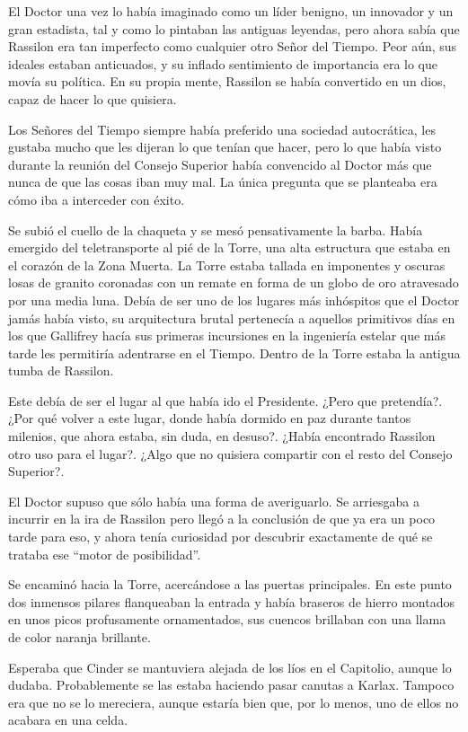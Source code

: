 El Doctor una vez lo había imaginado como un líder benigno, un innovador y un gran estadista, tal y como lo pintaban las antiguas leyendas, pero ahora sabía que Rassilon era tan imperfecto como cualquier otro Señor del Tiempo. Peor aún, sus ideales estaban anticuados, y su inflado sentimiento de importancia era lo que movía su política. En su propia mente, Rassilon se había convertido en un dios, capaz de hacer lo que quisiera. 

Los Señores del Tiempo siempre había preferido una sociedad autocrática, les gustaba mucho que les dijeran lo que tenían que hacer, pero lo que había visto durante la reunión del Consejo Superior había convencido al Doctor más que nunca de que las cosas iban muy mal. La única pregunta que se planteaba era cómo iba a interceder con éxito. 

Se subió el cuello de la chaqueta y se mesó pensativamente la barba. Había emergido del teletransporte al pié de la Torre, una alta estructura que estaba en el corazón de la Zona Muerta. La Torre estaba tallada en imponentes y oscuras losas de granito coronadas con un remate en forma de un globo de oro atravesado por una media luna. Debía de ser uno de los lugares más inhóspitos que el Doctor jamás había visto, su arquitectura brutal pertenecía a aquellos primitivos días en los que Gallifrey hacía sus primeras incursiones en la ingeniería estelar que más tarde les permitiría adentrarse en el Tiempo. Dentro de la Torre estaba la antigua tumba de Rassilon. 

Este debía de ser el lugar al que había ido el Presidente. ¿Pero que pretendía?. ¿Por qué volver a este lugar, donde había dormido en paz durante tantos milenios, que ahora estaba, sin duda, en desuso?. ¿Había encontrado Rassilon otro uso para el lugar?. ¿Algo que no quisiera compartir con el resto del Consejo Superior?. 

El Doctor supuso que sólo había una forma de averiguarlo. Se arriesgaba a incurrir en la ira de Rassilon pero llegó a la conclusión de que ya era un poco tarde para eso, y ahora tenía curiosidad por descubrir exactamente de qué se trataba ese ``motor de posibilidad''. 

Se encaminó hacia la Torre, acercándose a las puertas principales. En este punto dos inmensos pilares flanqueaban la entrada y había braseros de hierro montados en unos picos profusamente ornamentados, sus cuencos brillaban con una llama de color naranja brillante. 

Esperaba que Cinder se mantuviera alejada de los líos en el Capitolio, aunque lo dudaba. Probablemente se las estaba haciendo pasar canutas a Karlax. Tampoco era que no se lo mereciera, aunque estaría bien que, por lo menos, uno de ellos no acabara en una celda. 

